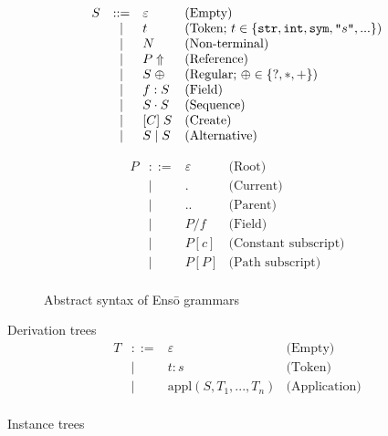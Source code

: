 \documentclass[a4paper]{article}
\def\enso{Ens\={o}\xspace}
\begin{document}
\begin{figure}
\begin{minipage}{0.5\textwidth}
\[
\begin{array}{rcll}
S & ::= & \varepsilon & \text{(Empty)} \\
  & \mid & t & \text{(Token; } t\in\{\text{\texttt{str}}, \text{\texttt{int}}, \text{\texttt{sym}}, \text{\texttt{"}}s\text{\texttt{"}},... \}\text{)} \\
  & \mid & N & \text{(Non-terminal)}\\
  & \mid & P\Uparrow & \text{(Reference)}\\
  & \mid & S\;\oplus & \text{(Regular; }\oplus\in\{?,*,+\}\text{)}\\ 
  & \mid & f:S & \text{(Field)}\\
  & \mid & S\cdot S & \text{(Sequence)}\\
  & \mid & [C]\; S & \text{(Create)}\\
  & \mid & S \mid S & \text{(Alternative)}\\
\end{array}
\]
\end{minipage}
\begin{minipage}{0.5\textwidth}
\[
\begin{array}{rcll}
P & ::= & \varepsilon & \text{(Root)}\\
  & \mid & . & \text{(Current)}\\
  & \mid & .. & \text{(Parent)}\\
  & \mid & P / f & \text{(Field)}\\
  & \mid & P [c] & \text{(Constant subscript)}\\
  & \mid & P [P] & \text{(Path subscript)}\\
\end{array}
\]
\end{minipage}
\caption{Abstract syntax of \enso grammars\label{FIG:metasyntax}}
\end{figure}

Derivation trees
\[
\begin{array}{rcll}
T & ::=  &\varepsilon & \text{(Empty)}\\
  & \mid & t: s & \text{(Token)}\\
  & \mid & \text{appl}(S, T_1, ..., T_n) & \text{(Application)}\\
\end{array}
\]




Instance trees
\end{document}
